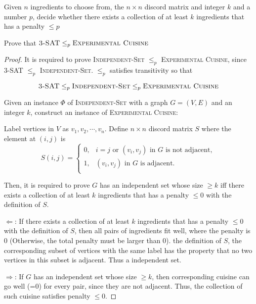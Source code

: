 \documentclass[12pt,a4paper]{article}
\theoremstyle{definition}
\begin{document}
\begin{enumerate}
        Given $n$ ingredients to choose from, the $n\times n$ discord matrix and integer $k$ and a number $p$,  decide whether there exists a collection of at least $k$ ingredients that has a penalty $\leq p$

    Prove that $\textsc{3-SAT}\leq_p\textsc{Experimental Cuisine}$
    
    \begin{proof}

        It is required to prove \textsc{Independent-Set} $\leq_p$ \textsc{Experimental Cuisine}, since \textsc{3-SAT} $\leq_p$ \textsc{Independent-Set}. $\leq_p$ satisfies transitivity so that 
        
        \begin{equation*}
            \textsc{3-SAT} \leq_p \textsc{Independent-Set} \leq_p \textsc{Experimental Cuisine}
        \end{equation*}

        Given an instance $\Phi$ of \textsc{Independent-Set} with a graph $G=(V,E)$ and an integer $k$, construct an instance of \textsc{Experimental Cuisine}:

        Label vertices in $V$ as $v_1,v_2,\cdots,v_n$. Define $n\times n$ discord matrix $S$ where the element at $(i,j)$ is
        \begin{equation*}
            S(i,j) = \begin{cases}
                0, & i=j\text{ or }(v_i,v_j)\text{ in $G$ is not adjacent},  \\
                1, & (v_i,v_j)\text{ in $G$ is adjacent}. \\
            \end{cases}
        \end{equation*}

        Then, it is required to prove $G$ has an independent set whose size $\geq k$ iff there exists a collection of at least $k$ ingredients that has a penalty $\leq 0$ with the definition of $S$.

        $\Leftarrow$: If there exists a collection of at least $k$ ingredients that has a penalty $\leq 0$ with the definition of $S$, then all pairs of ingredients fit well, where the penalty is 0 (Otherwise, the total penalty must be larger than 0). the definition of $S$, the corresponding subset of vertices with the same label has the property that no two vertices in this subset is adjacent. Thus a independent set.

        $\Rightarrow$: If $G$ has an independent set whose size $\geq k$, then corresponding cuisine can go well (=0) for every pair, since they are not adjacent. Thus, the collection of such cuisine satisfies penalty $\leq 0$.


\end{proof}
\end{enumerate}
\end{document}
